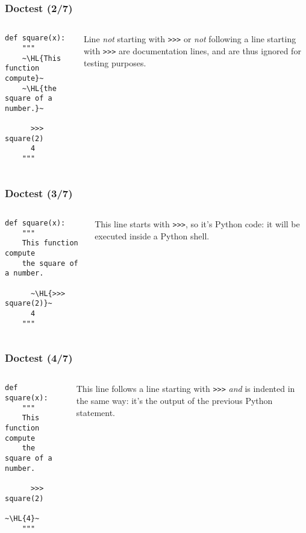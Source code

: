 \documentclass[english,serif,mathserif,xcolor=pdftex,dvipsnames,table]{beamer}
\begin{document}
\begin{frame}[fragile]
  \frametitle{Doctest (2/7)}
  \begin{columns}[t]
    \begin{column}{0.6\textwidth}
  \begin{lstlisting}
def square(x):
    """
    ~\HL{This function compute}~
    ~\HL{the square of a number.}~

      >>> square(2)
      4
    """
  \end{lstlisting}
\end{column}
\begin{column}{0.5\textwidth}
  \raggedleft Line \emph{not} starting with \texttt{>>>} or \emph{not}
  following a line starting with \texttt{>>>} are documentation lines,
  and are thus ignored for testing purposes.
\end{column}
\end{columns}
\end{frame}

\begin{frame}[fragile]
  \frametitle{Doctest (3/7)}
\begin{columns}[t]
  \begin{column}{0.6\textwidth}
  \begin{lstlisting}
def square(x):
    """
    This function compute
    the square of a number.

      ~\HL{>>> square(2)}~
      4
    """
  \end{lstlisting}
\end{column}
\begin{column}{0.4\textwidth}
  \raggedleft
  This line starts with \texttt{>>>}, so it's Python code: it will be
  executed inside a Python shell.
\end{column}
\end{columns}
\end{frame}

\begin{frame}[fragile]
  \frametitle{Doctest (4/7)}
\begin{columns}[t]
  \begin{column}{0.6\textwidth}
  \begin{lstlisting}
def square(x):
    """
    This function compute
    the square of a number.

      >>> square(2)
      ~\HL{4}~
    """
  \end{lstlisting}
\end{column}
\begin{column}{0.4\textwidth}
  \raggedleft
  This line follows a line starting with \texttt{>>>} \emph{and} is
  indented in the same way: it's the output of the previous Python
  statement.
\end{column}
\end{columns}
\end{frame}
\end{document}
